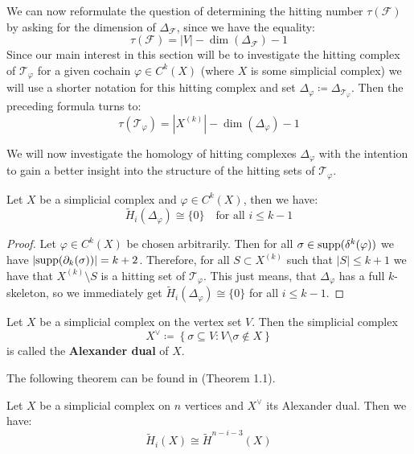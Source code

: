 We can now reformulate the question of determining the hitting number \(\tau(\mathcal{F})\) by asking for the dimension of \(\Delta_{\mathcal{F}}\), since we have the equality:
\[
\tau(\mathcal{F})=\left| V\right|-\dim(\Delta_{\mathcal{F}})-1
\]
Since our main interest in this section will be to investigate the hitting complex of \(\mathcal{T}_{\varphi}\) for a given cochain \(\varphi\in C^k(X)\) (where \(X\) is some simplicial complex) we will use a shorter notation for this hitting complex and set \(\Delta_{\varphi}\coloneqq \Delta_{\mathcal{T}_{\varphi}}\). Then the preceding formula turns to:
\[
\tau(\mathcal{T}_{\varphi})=|X^{(k)}|-\dim(\Delta_{\varphi})-1
\]

We will now investigate the homology of hitting complexes \(\Delta_{\varphi}\) with the intention to gain a better insight into the structure of the hitting sets of \(\mathcal{T}_{\varphi}\).

\begin{thm}
Let \(X\) be a simplicial complex and \(\varphi\in C^k(X)\), then we have:
\[
\tilde{H}_i(\Delta_{\varphi})\cong\{0\}\quad\text{for all }i\leq k-1
\]
\begin{proof}
Let \(\varphi\in C^k(X)\) be chosen arbitrarily. Then for all \(\sigma\in \mathrm{supp}(\delta^k(\varphi))\) we have \(\left|\mathrm{supp}(\partial_k(\sigma))\right|=k+2\). Therefore, for all \(S\subset X^{(k)}\) such that \(\left|S\right|\leq k+1\) we have that \(X^{(k)}\setminus S\) is a hitting set of \(\mathcal{T}_{\varphi}\). This just means, that \(\Delta_{\varphi}\) has a full \(k\)-skeleton, so we immediately get \(\tilde{H}_i(\Delta_{\varphi})\cong\{0\}\) for all \(i\leq k-1\).
\end{proof}
\end{thm}

\begin{defi}
Let \(X\) be a simplicial complex on the vertex set \(V\). Then the simplicial complex
\[
X^{\lor}\coloneqq \left\{\sigma\subseteq V:V\setminus\sigma\notin X\right\}
\]
is called the \textbf{Alexander dual} of \(X\).
\end{defi}

The following theorem can be found in \cite{8} (Theorem 1.1).

\begin{thm}\label{theorem12}
Let \(X\) be a simplicial complex on \(n\) vertices and \(X^{\lor}\) its Alexander dual. Then we have:
\[
\tilde{H}_i(X)\cong\tilde{H}^{n-i-3}(X)
\]
\end{thm}

